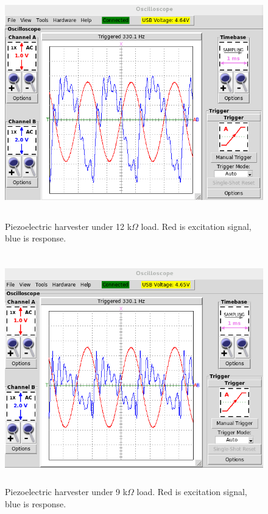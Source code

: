\begin{figure}[htb]
\begin{center}
\includegraphics[height=10cm]{images/own_measurement/generator_shaker/piezo_td_12k_330hz_2_2.png}
\end{center}
\caption{\label{fig:piezo_td_12k} Piezoelectric harvester under 12 k$\Omega$ load. Red is excitation signal, blue is response.}
\end{figure}

\begin{figure}[htb]
\begin{center}
\includegraphics[height=10cm]{images/own_measurement/generator_shaker/piezo_td_9k_330hz_2_2.png}
\end{center}
\caption{\label{fig:piezo_td_9k} Piezoelectric harvester under 9 k$\Omega$ load. Red is excitation signal, blue is response.}
\end{figure}

